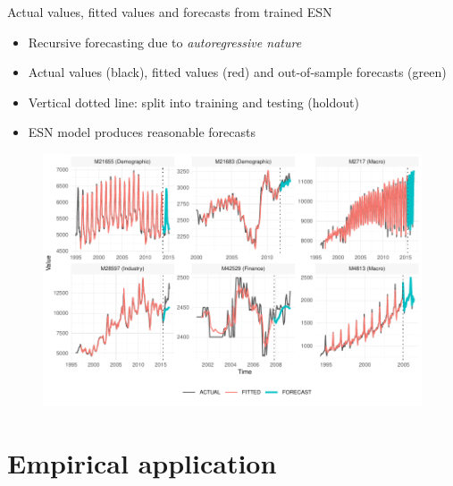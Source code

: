 \documentclass[aspectratio=169]{beamer}
\begin{document}
\begin{frame}[t]{Actual values, fitted values and forecasts from trained ESN}
    \begin{minipage}[t]{0.3\textwidth}
        \vspace{0pt}
        \begin{itemize}
        	\item Recursive forecasting due to \textit{autoregressive nature}
            \item Actual values (black), fitted values (red) and out-of-sample forecasts (green)
			\item Vertical dotted line: split into training and testing (holdout)
			\item ESN model produces reasonable forecasts
        \end{itemize}
    \end{minipage}%
    \hfill
    \begin{minipage}[t]{0.7\textwidth}
        \vspace{0pt}
 		\begin{figure}[H]
		\center
			\includegraphics[scale=0.7]{figures/figure_07_model_forecast_sample_wide.pdf}
		\end{figure}
    \end{minipage}
\end{frame}



\section{Empirical application}
\end{document}
